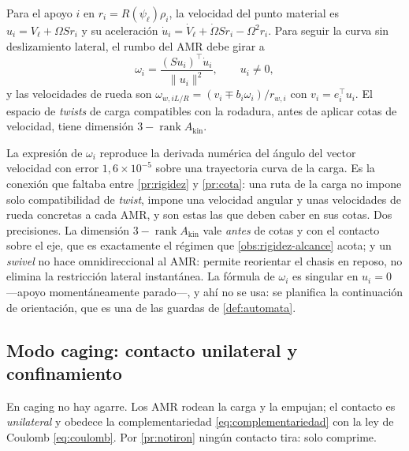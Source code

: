 \begin{proposicion}
\label{pr:ruta-ruedas}
Para el apoyo $i$ en $r_i=R(\psi_\ell)\rho_i$, la velocidad del punto material es
$u_i=V_\ell+\Omega S r_i$ y su aceleración
$\dot u_i=\dot V_\ell+\dot\Omega Sr_i-\Omega^{2}r_i$. Para seguir la curva sin
deslizamiento lateral, el rumbo del AMR debe girar a
\[
  \omega_i=\frac{(Su_i)^{\!\top}\dot u_i}{\lVert u_i\rVert^{2}},\qquad u_i\neq0,
\]
y las velocidades de rueda son $\omega_{w,iL/R}=(v_i\mp b_i\omega_i)/r_{w,i}$ con
$v_i=e_i^{\!\top}u_i$. El espacio de \emph{twists} de carga compatibles con la
rodadura, antes de aplicar cotas de velocidad, tiene dimensión
$3-\operatorname{rank}A_{\mathrm{kin}}$.
\end{proposicion}

\begin{observacion}
\label{obs:ruta-ruedas}
La expresión de $\omega_i$ reproduce la derivada numérica del ángulo del vector
velocidad con error $1{,}6\times10^{-5}$ sobre una trayectoria curva de la
carga. Es la conexión que faltaba entre \cref{pr:rigidez} y \cref{pr:cota}: una
ruta de la carga no impone solo compatibilidad de \emph{twist}, impone una
velocidad angular y unas velocidades de rueda concretas a cada AMR, y son estas
las que deben caber en sus cotas. Dos precisiones. La dimensión
$3-\operatorname{rank}A_{\mathrm{kin}}$ vale \emph{antes} de cotas y con el
contacto sobre el eje, que es exactamente el régimen que
\cref{obs:rigidez-alcance} acota; y un \emph{swivel} no hace omnidireccional al
AMR: permite reorientar el chasis en reposo, no elimina la restricción lateral
instantánea. La fórmula de $\omega_i$ es singular en $u_i=0$ —apoyo momentáneamente
parado—, y ahí no se usa: se planifica la continuación de orientación, que es una
de las guardas de \cref{def:automata}.
\end{observacion}

\subsection{Modo \textsf{caging}: contacto unilateral y confinamiento}

En \textsf{caging} no hay agarre. Los AMR rodean la carga y la empujan; el
contacto es \emph{unilateral} y obedece la complementariedad
\eqref{eq:complementariedad} con la ley de Coulomb \eqref{eq:coulomb}. Por
\cref{pr:notiron} ningún contacto tira: solo comprime.

